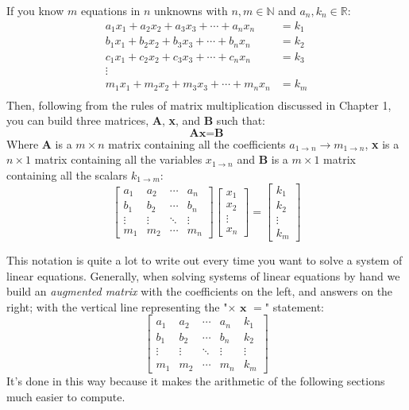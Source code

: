 \documentclass{tufte-book}
\begin{document}
If you know $m$ equations in $n$ unknowns with $n,m \in \mathbb{N}$ and $a_n,k_n \in \mathbb{R}$:
\begin{align*}
	a_1x_1+a_2x_2+a_3x_3+\cdots+a_nx_n & = k_1 \\
	b_1x_1+b_2x_2+b_3x_3+\cdots+b_nx_n & = k_2 \\
	c_1x_1+c_2x_2+c_3x_3+\cdots+c_nx_n & = k_3 \\
	\vdots                                     \\
	m_1x_1+m_2x_2+m_3x_3+\cdots+m_nx_n & = k_m \\
\end{align*}
Then, following from the rules of matrix multiplication discussed in Chapter 1, you can build three matrices,
\textbf{A}, \textbf{x}, and \textbf{B} such that:
\begin{equation*}
	\textbf{Ax}=\textbf{B}
\end{equation*}
Where \textbf{A} is a $m \times n$ matrix containing all the coefficients $a_{1 \to n} \to m_{1 \to n}$,
\textbf{x} is a $n \times 1$ matrix containing all the variables $x_{1 \to n}$ and \textbf{B} is a
$m \times 1$ matrix containing all the scalars $k_{1 \to m}$:
\begin{equation*}
	\begin{bmatrix}
		a_1    & a_2    & \cdots & a_n    \\
		b_1    & b_2    & \cdots & b_n    \\
		\vdots & \vdots & \ddots & \vdots \\
		m_1    & m_2    & \cdots & m_n
	\end{bmatrix}
	\begin{bmatrix}
		x_1    \\
		x_2    \\
		\vdots \\
		x_n
	\end{bmatrix}
	=
	\begin{bmatrix}
		k_1    \\
		k_2    \\
		\vdots \\
		k_m
	\end{bmatrix}
\end{equation*}

This notation is quite a lot to write out every time you want to solve a system of linear equations. Generally, when
solving systems of linear equations by hand we build an \emph{augmented matrix} with the coefficients on the left,
and answers on the right; with the vertical line representing the "$\times \textbf{ x } =$" statement:
\[
	\left[
		\begin{array}{cccc|c}
			a_1    & a_2    & \cdots & a_n    & k_1    \\
			b_1    & b_2    & \cdots & b_n    & k_2    \\
			\vdots & \vdots & \ddots & \vdots & \vdots \\
			m_1    & m_2    & \cdots & m_n    & k_m
		\end{array}
		\right]
\]
It's done in this way because it makes the arithmetic of the following sections much easier to compute.
\end{document}
